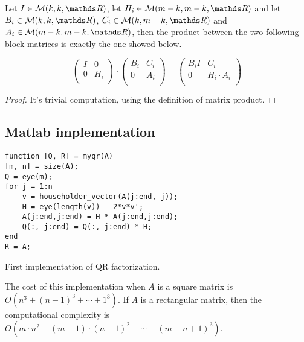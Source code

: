 \documentclass[computationalMathematics.tex]{subfiles}
\begin{document}
\begin{theorem}
  Let $I \in \mathcal{M}(k, k, \R)$, let $H_{i} \in \mathcal{M}(m-k, m-k, \R)$ and let $B_{i} \in \mathcal{M}(k, k, \R)$, $C_{i} \in \mathcal{M}(k, m-k, \R)$ and $A_{i} \in \mathcal{M}(m-k, m-k, \R)$, then the product between the two following block matrices is exactly the one showed below.

\[\begin{pmatrix}
    I & 0\\
    0 & H_{i}\\
  \end{pmatrix}
  \cdot 
  \begin{pmatrix}
    B_{i} & C_{i}\\
    0 & A_{i}\\
  \end{pmatrix}
  = 
  \begin{pmatrix}
    B_{i}I & C_{i}\\
    0 & H_{i} \cdot A_{i}\\
  \end{pmatrix}
\]
\end{theorem}

\begin{proof}
  It's trivial computation, using the definition of matrix product.
\end{proof}

\subsection{Matlab implementation}

\begin{center}
\begin{minipage}{.9\linewidth}
\begin{algorithm}[H]
\begin{verbatim}
function [Q, R] = myqr(A)
[m, n] = size(A);
Q = eye(m);
for j = 1:n
    v = householder_vector(A(j:end, j));
    H = eye(length(v)) - 2*v*v';
    A(j:end,j:end) = H * A(j:end,j:end);
    Q(:, j:end) = Q(:, j:end) * H;
end
R = A;
\end{verbatim}
  \label{alg:26ottQR1}
\caption{First implementation of QR factorization.}
\end{algorithm}
\end{minipage}
\end{center}

\begin{proposition}
  The cost of this implementation when $A$ is a square matrix is $O(n^{3} + {(n-1)}^{3} + \cdots + 1^{3})$. If $A$ is a rectangular matrix, then the computational complexity is $O(m \cdot n^{2} + {(m-1) \cdot (n-1)}^{2} + \cdots + {(m - n + 1)}^{3})$.
\end{proposition}
\end{document}
